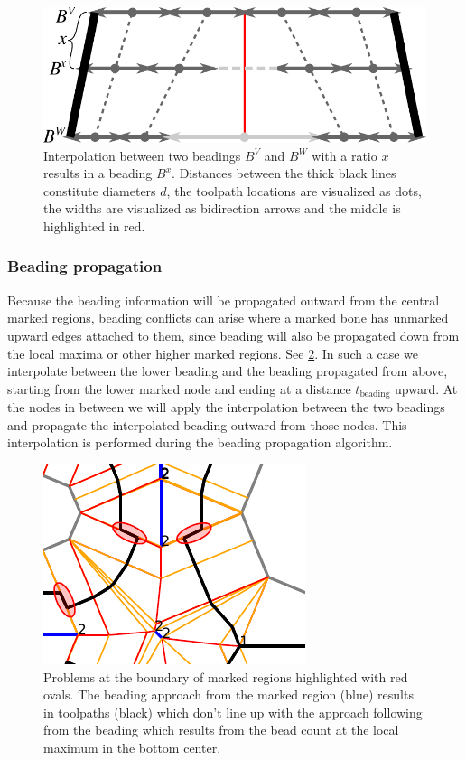 \begin{figure}
\centering
\includegraphics[width=.8\columnwidth]{sources/method/beading_interpolation_v2.pdf}
\caption{
Interpolation between two beadings $B^V$ and $B^W$ with a ratio $x$ results in a beading $B^x$.
Distances between the thick black lines constitute diameters $d$,
the toolpath locations are visualized as dots,
the widths are visualized as bidirection arrows
and the middle is highlighted in red.
}
\label{beading_interpolation}
\end{figure}


\subsubsection{Beading propagation}\label{section_beading_conflicts}
Because the beading information will be propagated outward from the central marked regions, beading conflicts can arise where a marked bone has unmarked upward edges attached to them, since beading will also be propagated down from the local maxima or other higher marked regions.
See \cref{beading_conflict_problem}.
In such a case we interpolate between the lower beading and the beading propagated from above,
starting from the lower marked node and ending at a distance $t_\text{beading}$ upward.
At the nodes in between we will apply the interpolation between the two beadings and propagate the interpolated beading outward from those nodes.
This interpolation is performed during the beading propagation algorithm.


\begin{figure}
\centering
\includegraphics[width=.5\columnwidth]{sources/method/transition_to_insignificance_problem.pdf}
\caption{
Problems at the boundary of marked regions highlighted with red ovals.
The beading approach from the marked region (blue) results in toolpaths (black) which don't line up with the approach following from the beading which results from the bead count at the local maximum in the bottom center.
}
\label{beading_conflict_problem}
\end{figure}

